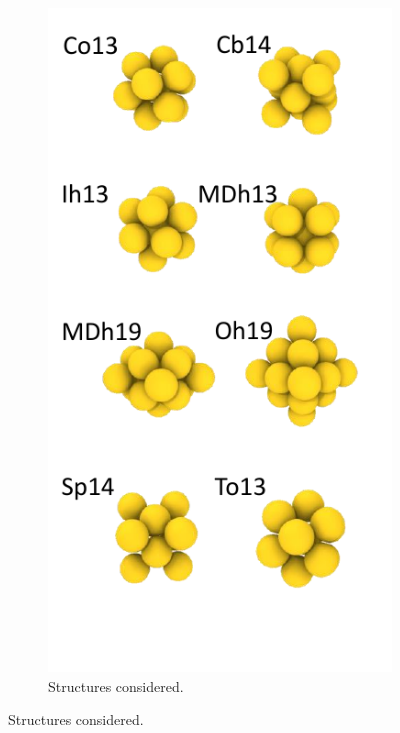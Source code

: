 \begin{figure}
\centering
    \begin{subfigure}{0.29\textwidth}
        \includegraphics[width=\textwidth]{figures/LM/Atomistic/Struts.pdf}
        \caption{Structures considered.}
        \label{fig:AuNPs_Struts}
    \end{subfigure}

\end{figure}
